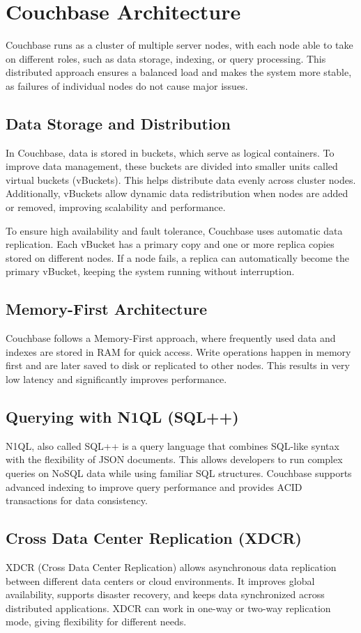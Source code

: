 \newpage
\chapter{Couchbase Architecture}
Couchbase runs as a cluster of multiple server nodes, with each node able to take on different roles, such as data storage, indexing, or query processing. This distributed approach ensures a balanced load and makes the system more stable, as failures of individual nodes do not cause major issues.
\section{Data Storage and Distribution}
In Couchbase, data is stored in buckets, which serve as logical containers. To improve data management, these buckets are divided into smaller units called virtual buckets (vBuckets). This helps distribute data evenly across cluster nodes. Additionally, vBuckets allow dynamic data redistribution when nodes are added or removed, improving scalability and performance.

To ensure high availability and fault tolerance, Couchbase uses automatic data replication. Each vBucket has a primary copy and one or more replica copies stored on different nodes. If a node fails, a replica can automatically become the primary vBucket, keeping the system running without interruption.
\cite{CouchbaseArchitectureOverview}
\section{Memory-First Architecture}
Couchbase follows a Memory-First approach, where frequently used data and indexes are stored in RAM for quick access. Write operations happen in memory first and are later saved to disk or replicated to other nodes. This results in very low latency and significantly improves performance.
\section{Querying with N1QL (SQL++)}
N1QL, also called SQL++ is a query language that combines SQL-like syntax with the flexibility of JSON documents. This allows developers to run complex queries on NoSQL data while using familiar SQL structures. Couchbase supports advanced indexing to improve query performance and provides ACID transactions for data consistency.
\cite{CouchbaseN1QL}
\section{Cross Data Center Replication (XDCR)}
XDCR (Cross Data Center Replication) allows asynchronous data replication between different data centers or cloud environments. It improves global availability, supports disaster recovery, and keeps data synchronized across distributed applications. XDCR can work in one-way or two-way replication mode, giving flexibility for different needs.

